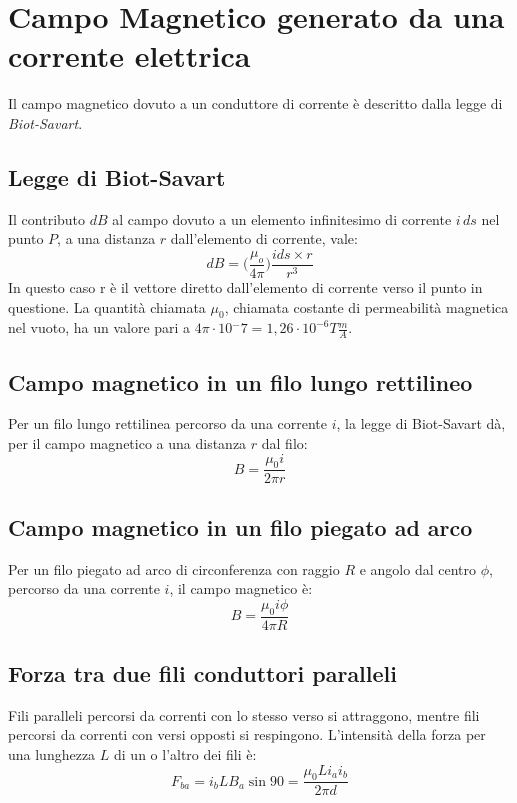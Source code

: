     \section{Campo Magnetico generato da una corrente elettrica} Il campo 
    magnetico dovuto a un conduttore di corrente è descritto dalla legge di
    \textit{Biot-Savart}.

        \subsection{Legge di Biot-Savart} Il contributo $dB$ al campo dovuto a
        un elemento infinitesimo di corrente $i\,ds$ nel punto $P$, a una
        distanza $r$ dall'elemento di corrente, vale:
            \begin{equation}
                dB = \Bigg(\frac{\mu_o}{4\pi}\Bigg)\frac{ids\times r}{r^3}
            \end{equation}
        In questo caso r è il vettore diretto dall'elemento di corrente verso il
        punto in questione. La quantità chiamata $\mu_0$, chiamata costante di 
        permeabilità magnetica nel vuoto, ha un valore pari a $4\pi \cdot 
        10{^-7} = 1,26 \cdot 10^{-6} T \frac{m}{A}$.

        \subsection{Campo magnetico in un filo lungo rettilineo} Per un filo 
        lungo rettilinea percorso da una corrente $i$, la legge di Biot-Savart 
        dà, per il campo magnetico a una distanza $r$ dal filo:
            \begin{equation}
                B = \frac{\mu_0i}{2\pi r}
            \end{equation}

        \subsection{Campo magnetico in un filo piegato ad arco} Per un filo 
        piegato ad arco di circonferenza con raggio $R$ e angolo dal centro 
        $\phi$, percorso da una corrente $i$, il campo magnetico è:
            \begin{equation}
                B = \frac{\mu_0i\phi}{4\pi R}
            \end{equation}
        
        \subsection{Forza tra due fili conduttori paralleli} Fili paralleli 
        percorsi da correnti con lo stesso verso si attraggono, mentre fili 
        percorsi da correnti con versi opposti si respingono. L'intensità della
        forza per una lunghezza $L$ di un o l'altro dei fili è:
            \begin{equation}
                F_{ba} = i_bLB_a\sin90 = \frac{\mu_0Li_ai_b}{2\pi d}
            \end{equation}

